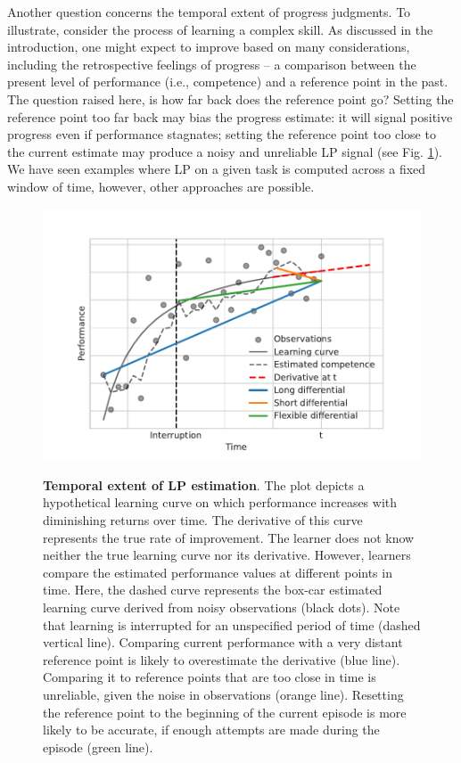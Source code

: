 Another question concerns the temporal extent of progress judgments. To illustrate, consider the process of learning a complex skill. As discussed in the introduction, one might expect to improve based on many considerations, including the retrospective feelings of progress -- a comparison between the present level of performance (i.e., competence) and a reference point in the past. The question raised here, is how far back does the reference point go? Setting the reference point too far back may bias the progress estimate: it will signal positive progress even if performance stagnates; setting the reference point too close to the current estimate may produce a noisy and unreliable \ac{LP} signal (see Fig. \ref{fig:5-lptw}). We have seen examples where \ac{LP} on a given task is computed across a fixed window of time, however, other approaches are possible.

\begin{figure}[bth]
    \centering
    {\includegraphics[width=.8\linewidth]{Figures/c5/lptw.pdf}}
    \caption[short figure description]{\textbf{Temporal extent of \ac{LP} estimation}. The plot depicts a hypothetical learning curve on which performance increases with diminishing returns over time. The derivative of this curve represents the true rate of improvement. The learner does not know neither the true learning curve nor its derivative. However, learners compare the estimated performance values at different points in time. Here, the dashed curve represents the box-car estimated learning curve derived from noisy observations (black dots). Note that learning is interrupted for an unspecified period of time (dashed vertical line). Comparing current performance with a very distant reference point is likely to overestimate the derivative (blue line). Comparing it to reference points that are too close in time is unreliable, given the noise in observations (orange line). Resetting the reference point to the beginning of the current episode is more likely to be accurate, if enough attempts are made during the episode (green line).}\label{fig:5-lptw}
\end{figure}

